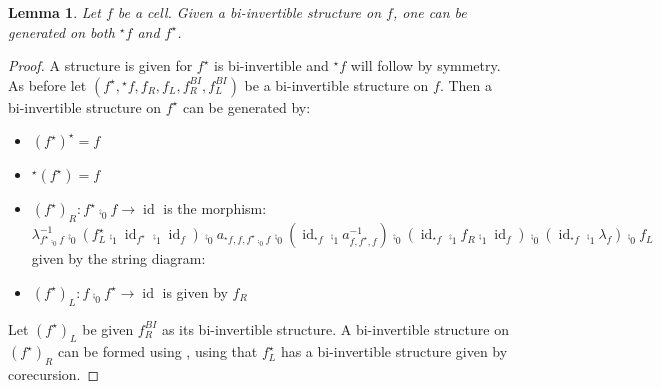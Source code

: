 \documentclass[draft]{article}
\newtheorem{lemma}[theorem]{Lemma} \theoremstyle{definition}
\DeclareMathOperator{\id}{id}
\newcommand{\linv}[1]{{}^\star\!#1} \newcommand{\rinv}[1]{#1^\star}
\begin{document}
\begin{lemma}\label{inverses}
  Let \(f\) be a cell. Given a bi-invertible structure on \(f\), one
  can be generated on both \(\linv f\) and \(\rinv f\).
\end{lemma}
\begin{proof}
  A structure is given for \(\rinv f\) is bi-invertible and \(\linv
  f\) will follow by symmetry. As before let \((\rinv f, \linv f, f_R,
  f_L, f_R^{BI}, f_L^{BI})\) be a bi-invertible structure on \(f\).
  Then a bi-invertible structure on \(\rinv f\) can be generated by:
  \begin{itemize}
  \item \(\rinv {(\rinv f)} = f\)
  \item \(\linv {(\rinv f)} = f\)
  \item \({(\rinv f)}_R: \rinv f \comp_0 f \to \id\) is the morphism:
    \begin{equation*}
      \lambda_{\rinv f \comp_0 f}^{-1} \comp_0 (\rinv {f_L} \comp_1 \id_{\rinv f} \comp_1 \id_f) \comp_0 a_{\linv f, f, \rinv f \comp_0 f} \comp_0 (\id_{\linv f} \comp_1 a_{f, \rinv f, f}^{-1}) \comp_0 (\id_{\linv f} \comp_1 f_R \comp_1 \id_f) \comp_0 (\id_{\linv f} \comp_1 \lambda_f) \comp_0 f_L
    \end{equation*}
    given by the string diagram:
    \begin{center}
    \end{center}
  \item \({(\rinv f)}_L: f \comp_0 \rinv f \to \id\) is given by
    \(f_R\)
  \end{itemize}
  Let \({(\rinv f)}_L\) be given \(f_R^{BI}\) as its bi-invertible
  structure. A bi-invertible structure on \({(\rinv f)}_R\) can be
  formed using , using that \(\rinv {f_L}\)
  has a bi-invertible structure given by corecursion.
\end{proof}
\end{document}
